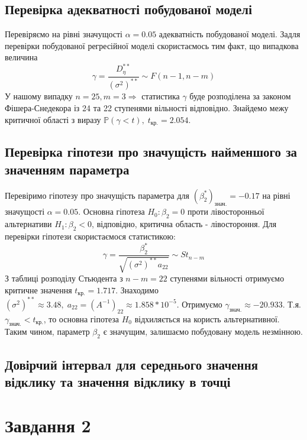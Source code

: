 \documentclass{article}
\begin{document}
    \subsection{Перевірка адекватності побудованої моделі}
      Перевіряємо на рівні значущості $\alpha = 0.05$ адекватність побудованої моделі.  
      Задля перевірки побудованої регресійної моделі скористаємось тим факт, що 
      випадкова величина 
      \begin{equation}
        \gamma = \frac{D^{**}_\eta}{(\sigma^2)^{**}}\sim F(n-1, n-m)
      \end{equation}
      У нашому випадку $n = 25, m = 3 \Rightarrow$ статистика $\gamma$ буде 
      розподілена за законом Фішера-Снедекора із 24 та 22 ступенями вільності 
      відповідно. Знайдемо межу критичної області з виразу $\mathbb{P}
      (\gamma < t), \; t_{\text{кр.}} = 2.054$.
    \subsection{Перевірка гіпотези про значущість найменшого за значенням параметра}
      Перевіримо гіпотезу про значущість параметра для $(\beta_2^*)_{\text{знач.}} = 
      -0.17$ на рівні значущості $\alpha = 0.05$. Основна гіпотеза $ H_0 : \beta_2 = 0$ проти лівосторонньої 
      альтернативи $ H_1 : \beta_2 < 0$, відповідно, критична область - 
      лівостороння. Для перевірки гіпотези скористаємося статистикою:
      \begin{equation}
        \gamma = \frac{\beta_2^*}{\sqrt{(\sigma^2)^{**} a_{22}}} \sim St_{n-m}
      \end{equation}
      З таблиці розподілу Стьюдента з $n - m = 22$ ступенями вільності 
      отримуємо критичне значення $t_\text{кр.} = 1.717$. Знаходимо $(\sigma^2)^{**} 
      \approx 3.48, \; a_{22} = (A^{-1})_{22} \approx 1.858 * 10^{-5}$. Отримуємо 
      $\gamma_\text{знач.} \approx -20.933$. Т.я. $\gamma_\text{знач.} < t_\text{кр.}$, 
      то основна гіпотеза $H_0$ відхиляється на користь альтернативної. Таким чином, 
      параметр $\beta_2$ є значущим, залишаємо побудовану модель незмінною.
    \subsection{Довірчий інтервал для середнього значення відклику та значення відклику в точці}
  \newpage
  \section{Завдання 2}
\end{document}
